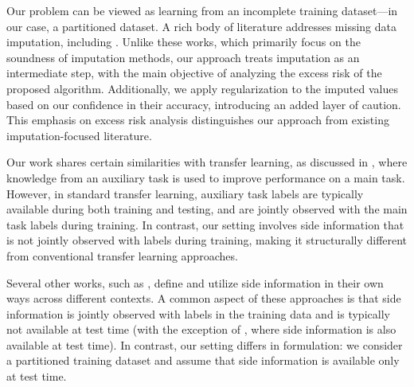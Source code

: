 Our problem can be viewed as learning from an incomplete training dataset—in our case, a partitioned dataset. A rich body of literature addresses missing data imputation, including \cite{bertsimas2018predictive, van2007multiple, ghahramani1993supervised, stekhoven2012missforest, nguyen2023imputation}. Unlike these works, which primarily focus on the soundness of imputation methods, our approach treats imputation as an intermediate step, with the main objective of analyzing the excess risk of the proposed algorithm. Additionally, we apply regularization to the imputed values based on our confidence in their accuracy, introducing an added layer of caution. This emphasis on excess risk analysis distinguishes our approach from existing imputation-focused literature.

Our work shares certain similarities with transfer learning, as discussed in \cite{hosna2022transfer}, where knowledge from an auxiliary task is used to improve performance on a main task. However, in standard transfer learning, auxiliary task labels are typically available during both training and testing, and are jointly observed with the main task labels during training. In contrast, our setting involves side information that is not jointly observed with labels during training, making it structurally different from conventional transfer learning approaches.

Several other works, such as \cite{adel2023general, chen2012boosting, jonschkowski2015patterns, mollaysa2017regularising}, define and utilize side information in their own ways across different contexts. A common aspect of these approaches is that side information is jointly observed with labels in the training data and is typically not available at test time (with the exception of \cite{adel2023general}, where side information is also available at test time). In contrast, our setting differs in formulation: we consider a partitioned training dataset and assume that side information is available only at test time.








